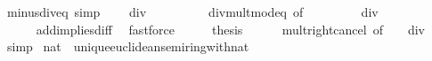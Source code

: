 \begin{isabellebody}
\endisatagproof
{\isafoldproof}%
%
\isadelimproof
\isanewline
%
\endisadelimproof
\isanewline
{}\isamarkupfalse%
\ minus{\isacharunderscore}{\kern0pt}{}{\isacharunderscore}{\kern0pt}div{\isacharunderscore}{\kern0pt}{}{\isacharunderscore}{\kern0pt}eq\ {\isacharbrackleft}{\kern0pt}simp{\isacharbrackright}{\kern0pt}{\isacharcolon}{\kern0pt}\isanewline
\ \ {\isachardoublequoteopen}{\isacharminus}{\kern0pt}\ {}\ div\ {}\ {\isacharequal}{\kern0pt}\ {\isacharminus}{\kern0pt}\ {}{\isachardoublequoteclose}\isanewline
%
\isadelimproof
%
\endisadelimproof
%
\isatagproof
{}\isamarkupfalse%
\ {\isacharminus}{\kern0pt}\isanewline
\ \ \isamarkupfalse%
\ div{\isacharunderscore}{\kern0pt}mult{\isacharunderscore}{\kern0pt}mod{\isacharunderscore}{\kern0pt}eq\ {\isacharbrackleft}{\kern0pt}of\ {\isachardoublequoteopen}{\isacharminus}{\kern0pt}\ {}{\isachardoublequoteclose}\ {}{\isacharbrackright}{\kern0pt}\isanewline
\ \ \isamarkupfalse%
\ {\isachardoublequoteopen}{\isacharminus}{\kern0pt}\ {}\ div\ {}\ {\isacharasterisk}{\kern0pt}\ {}\ {\isacharequal}{\kern0pt}\ {\isacharminus}{\kern0pt}\ {}\ {\isacharasterisk}{\kern0pt}\ {}{\isachardoublequoteclose}\isanewline
\ \ \ \ \isamarkupfalse%
\ add{\isacharunderscore}{\kern0pt}implies{\isacharunderscore}{\kern0pt}diff\ \isamarkupfalse%
\ fastforce\isanewline
\ \ \isamarkupfalse%
\ \isamarkupfalse%
\ {\isacharquery}{\kern0pt}thesis\isanewline
\ \ \ \ \isamarkupfalse%
\ mult{\isacharunderscore}{\kern0pt}right{\isacharunderscore}{\kern0pt}cancel\ {\isacharbrackleft}{\kern0pt}of\ {}\ {\isachardoublequoteopen}{\isacharminus}{\kern0pt}\ {}\ div\ {}{\isachardoublequoteclose}\ {\isachardoublequoteopen}{\isacharminus}{\kern0pt}\ {}{\isachardoublequoteclose}{\isacharbrackright}{\kern0pt}\ \isamarkupfalse%
\ simp\isanewline
{}\isamarkupfalse%
%
\endisatagproof
{\isafoldproof}%
%
\isadelimproof
\isanewline
%
\endisadelimproof
\isanewline
{}\isamarkupfalse%
%
\isadelimdocument
%
\endisadelimdocument
%
\isatagdocument
%
\isamarkuptrue%
%
\endisatagdocument
{\isafolddocument}%
%
\isadelimdocument
%
\endisadelimdocument
{}\isamarkupfalse%
\ nat\ {\isacharcolon}{\kern0pt}{\isacharcolon}{\kern0pt}\ unique{\isacharunderscore}{\kern0pt}euclidean{\isacharunderscore}{\kern0pt}semiring{\isacharunderscore}{\kern0pt}with{\isacharunderscore}{\kern0pt}nat\isanewline

\end{isabellebody}
